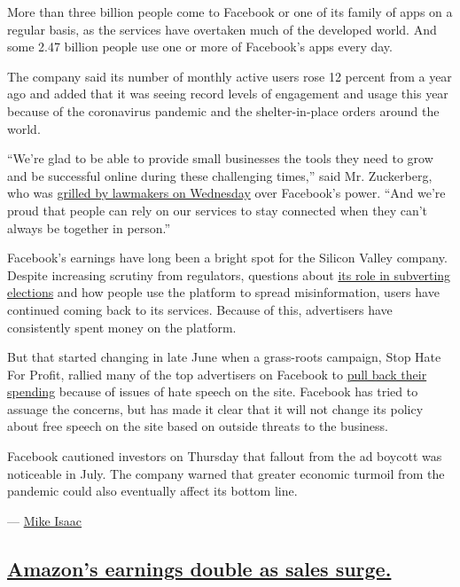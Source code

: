 More than three billion people come to Facebook or one of its family of
apps on a regular basis, as the services have overtaken much of the
developed world. And some 2.47 billion people use one or more of
Facebook's apps every day.

The company said its number of monthly active users rose 12 percent from
a year ago and added that it was seeing record levels of engagement and
usage this year because of the coronavirus pandemic and the
shelter-in-place orders around the world.

``We're glad to be able to provide small businesses the tools they need
to grow and be successful online during these challenging times,'' said
Mr. Zuckerberg, who was
\href{https://www.nytimes3xbfgragh.onion/2020/07/29/technology/big-tech-hearing-apple-amazon-facebook-google.html}{grilled
by lawmakers on Wednesday} over Facebook's power. ``And we're proud that
people can rely on our services to stay connected when they can't always
be together in person.''

Facebook's earnings have long been a bright spot for the Silicon Valley
company. Despite increasing scrutiny from regulators, questions about
\href{https://www.nytimes3xbfgragh.onion/2018/02/17/technology/indictment-russian-tech-facebook.html}{its
role in subverting elections} and how people use the platform to spread
misinformation, users have continued coming back to its services.
Because of this, advertisers have consistently spent money on the
platform.

But that started changing in late June when a grass-roots campaign, Stop
Hate For Profit, rallied many of the top advertisers on Facebook to
\href{https://www.nytimes3xbfgragh.onion/2020/06/30/technology/facebook-advertising-boycott.html}{pull
back their spending} because of issues of hate speech on the site.
Facebook has tried to assuage the concerns, but has made it clear that
it will not change its policy about free speech on the site based on
outside threats to the business.

Facebook cautioned investors on Thursday that fallout from the ad
boycott was noticeable in July. The company warned that greater economic
turmoil from the pandemic could also eventually affect its bottom line.

--- \href{https://www.nytimes3xbfgragh.onion/by/mike-isaac}{Mike Isaac}

\hypertarget{amazons-earnings-double-as-sales-surge}{%
\subsection{\texorpdfstring{\protect\hyperlink{amazons-earnings-double-as-sales-surge}{Amazon's
earnings double as sales
surge.}}{Amazon's earnings double as sales surge.}}\label{amazons-earnings-double-as-sales-surge}}

